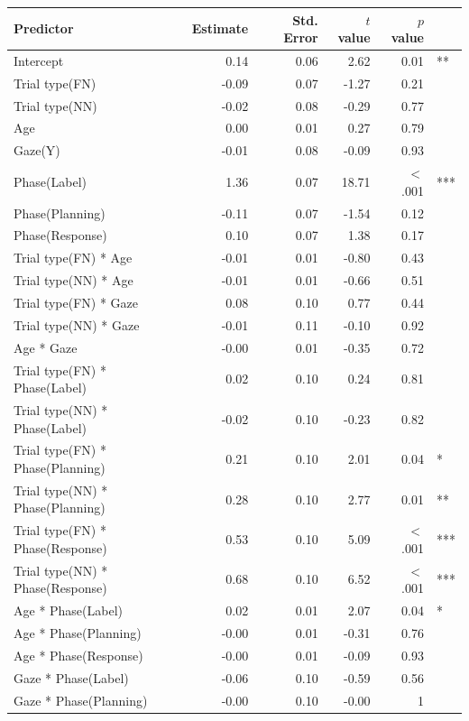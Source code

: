 \documentclass[a4paper,man,apacite,floatsintext]{apa6}
\begin{document}
\begin{table}[tb]
\centering
\begin{tabular}{lrrrrl}
 Predictor & Estimate & Std. Error & $t$ value & $p$ value &  \\ 
  \hline
Intercept & 0.14 & 0.06 & 2.62 & 0.01 & ** \\ 
  Trial type(FN) & -0.09 & 0.07 & -1.27 & 0.21 &  \\ 
  Trial type(NN) & -0.02 & 0.08 & -0.29 & 0.77 &  \\ 
  Age & 0.00 & 0.01 & 0.27 & 0.79 &  \\ 
  Gaze(Y) & -0.01 & 0.08 & -0.09 & 0.93 &  \\ 
  Phase(Label) & 1.36 & 0.07 & 18.71 & $<$ .001 & *** \\ 
  Phase(Planning) & -0.11 & 0.07 & -1.54 & 0.12 &  \\ 
  Phase(Response) & 0.10 & 0.07 & 1.38 & 0.17 &  \\ 
  Trial type(FN) * Age & -0.01 & 0.01 & -0.80 & 0.43 &  \\ 
  Trial type(NN) * Age & -0.01 & 0.01 & -0.66 & 0.51 &  \\ 
  Trial type(FN) * Gaze & 0.08 & 0.10 & 0.77 & 0.44 &  \\ 
  Trial type(NN) * Gaze & -0.01 & 0.11 & -0.10 & 0.92 &  \\ 
  Age * Gaze & -0.00 & 0.01 & -0.35 & 0.72 &  \\ 
  Trial type(FN) * Phase(Label) & 0.02 & 0.10 & 0.24 & 0.81 &  \\ 
  Trial type(NN) * Phase(Label) & -0.02 & 0.10 & -0.23 & 0.82 &  \\ 
  Trial type(FN) * Phase(Planning) & 0.21 & 0.10 & 2.01 & 0.04 & * \\ 
  Trial type(NN) * Phase(Planning) & 0.28 & 0.10 & 2.77 & 0.01 & ** \\ 
  Trial type(FN) * Phase(Response) & 0.53 & 0.10 & 5.09 & $<$ .001 & *** \\ 
  Trial type(NN) * Phase(Response) & 0.68 & 0.10 & 6.52 & $<$ .001 & *** \\ 
  Age * Phase(Label) & 0.02 & 0.01 & 2.07 & 0.04 & * \\ 
  Age * Phase(Planning) & -0.00 & 0.01 & -0.31 & 0.76 &  \\ 
  Age * Phase(Response) & -0.00 & 0.01 & -0.09 & 0.93 &  \\ 
  Gaze * Phase(Label) & -0.06 & 0.10 & -0.59 & 0.56 &  \\ 
  Gaze * Phase(Planning) & -0.00 & 0.10 & -0.00 & 1 &  \\ 

\end{tabular}
\end{table}
\end{document}
